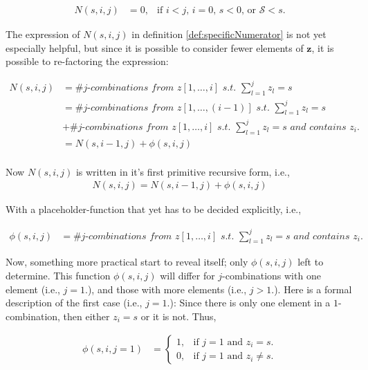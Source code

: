 \documentclass[a4paper,11pt]{article}
\begin{document}
\begin{align}
\label{eq:Subrecursion1}
N(s,i,j) &=0, & \text{if $i < j$, $i=0$, $s < 0$, or $\mathcal{S} < s$.}
\end{align}

The expression of $N(s,i,j)$ in definition \ref{def:specificNumerator} is not yet especially helpful, but since it is possible to consider fewer elements of $\bm{z}$, it is possible to re-factoring the expression:

\begin{align*}
N(s,i,j) &= \textit{\# $j$-combinations from $z[1,\ldots,i]$ s.t. $\sum _{l=1}^{j}z_{l}=s$} \\
        &= \textit{\# $j$-combinations from $z[1,\ldots,(i-1)]$ s.t. $\sum _{l=1}^{j}z_{l}=s$} \\
        &+ \textit{\# $j$-combinations from $z[1,\ldots,i]$ s.t. $\sum _{l=1}^{j}z_{l}=s$ and contains $z_{i}$.} \\
        &= N(s,i-1,j)+ \phi (s,i,j) \\
\end{align*}

Now $N(s,i,j)$ is written in it's first primitive recursive form, i.e.,
\begin{align}
\label{eq:recursion1}
N(s,i,j) = N(s,i-1,j)+ \phi (s,i,j)
\end{align}

With a placeholder-function that yet has to be decided explicitly, i.e.,

\begin{align}
\label{eq:cond2}
\phi (s,i,j) &= \textit{\# $j$-combinations from $z[1,\ldots,i]$ s.t. $\sum _{l=1}^{j}z_{l}=s$ and contains $z_{i}$.}
\end{align}

Now, something more practical start to reveal itself; only $\phi (s,i,j)$ left to determine. This function $\phi (s,i,j)$ will differ for $j$-combinations with one element (i.e., $j=1$.), and those with more elements (i.e., $j>1$.). Here is a formal description of the first case (i.e., $j=1$.): Since there is only one element in a $1$-combination, then either $z_{i}=s$ or it is not. Thus,

\begin{align}
\label{eq:cond3}
\phi (s,i,j=1) &=\begin{cases}
    1, & \text{if $j=1$ and $z_{i}=s$}.\\
    0, & \text{if $j=1$ and $z_{i}\neq s$}.
  \end{cases}
\end{align}
\end{document}
